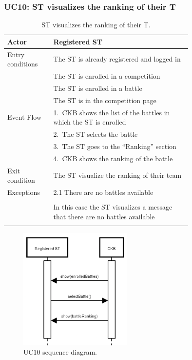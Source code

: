 \subsubsection*{UC10: ST visualizes the ranking of their T}
\begin{center}
  \begin{longtable}{l|p{0.75\linewidth}}
    \hline
    Actor & Registered ST \\
    \hline
    Entry conditions & The ST is already registered and logged in \\
    & The ST is enrolled in a competition \\
    & The ST is enrolled in a battle \\
    & The ST is in the competition page \\
    \hline
    Event Flow & 1.\ CKB shows the list of the battles in which the ST is enrolled \\
    & 2.\ The ST selects the battle \\
    & 3.\ The ST goes to the “Ranking” section \\
    & 4.\ CKB shows the ranking of the battle \\
    \hline
    Exit condition &  The ST visualize the ranking of their team \\
    \hline
    Exceptions & 2.1 There are no battles available \\ \\
    & In this case the ST visualizes a message that there are no battles available \\
    \hline
    \caption{ST visualizes the ranking of their T.}
    \label{tab: ST_visualize_ranking}
  \end{longtable}

  \begin{figure} [H]
    \begin{center}
        \includegraphics[width=0.5\textwidth,height=\textheight,keepaspectratio]{Images/SequenceDiagrams/UC10.png}
        \caption{UC10 sequence diagram.}
        \label{fig: UC10_sequence_diagram}
    \end{center}
  \end{figure}
\end{center}

